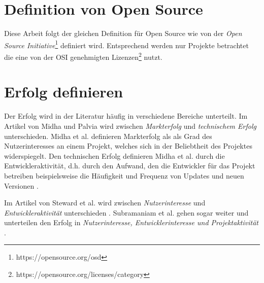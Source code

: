 \section{Definition von Open Source}

Diese Arbeit folgt der gleichen Definition für Open Source wie von der
\textit{Open Source Initiative}\footnote{https://opensource.org/osd} definiert wird. Entsprechend
werden nur Projekte betrachtet die eine von der
OSI genehmigten Lizenzen\footnote{https://opensource.org/licenses/category}
nutzt.


\section{Erfolg definieren}


Der Erfolg wird in der Literatur häufig in verschiedene Bereiche unterteilt.
Im Artikel von Midha und Palvia wird zwischen \textit{Markterfolg} und \textit{technischem Erfolg}
unterschieden.
Midha et al. definieren Markterfolg als
als Grad des Nutzerinteresses an einem Projekt, %
welches sich in der Beliebtheit des Projektes widerspiegelt.
Den technischen Erfolg definieren Midha et al. durch die Entwickleraktivität, d.h. durch den Aufwand,
den die Entwickler für das Projekt betreiben %
beispielsweise die Häufigkeit und Frequenz von Updates und neuen Versionen
\cite{midhaFactorsAffectingSuccess2012}. %


Im Artikel von Steward et al. wird zwischen \textit{Nutzerinteresse} und \textit{Entwickleraktivität} unterschieden
\cite{stewartImpactsLicenseChoice2006a}. %
Subramaniam et al. gehen sogar weiter und unterteilen den Erfolg in
\textit{Nutzerinteresse, Entwicklerinteresse und Projektaktivität}
\cite{subramaniamDeterminantsOpenSource2009}. %

